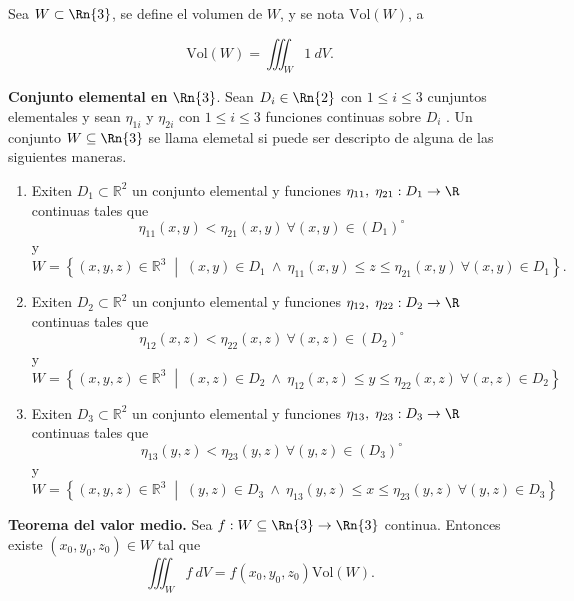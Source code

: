 \begin{definition} Sea $W\subset\Rn{3}$,  se define el volumen de $W$,  y se nota $\text{Vol}(W)$,  a  
    
    \[
        \text{Vol}(W)=\iiint_W 1 \:dV.
    \]
\end{definition}


\begin{definition}
    \textbf{Conjunto elemental en }$\Rn{3}$. Sean $D_i\in \Rn{2}$ con $1 \leq i \leq 3$  cunjuntos elementales y sean $\eta_{1i}$ y $\eta_{2i}$  con $1 \leq i \leq 3$ funciones continuas sobre $D_i$ .  Un conjunto $W\subseteq\Rn{3}$ se llama elemetal si puede ser descripto de alguna de las siguientes maneras. 
    \begin{enumerate}
    \item Exiten $D_1 \subset  \mathbb{R}^2 $ un conjunto elemental y funciones  $\eta_{11},\; \eta_{21}: D_1\to\R$  continuas  tales que $$\eta_{11}(x, y) <  \eta_{21}(x, y)  \: \forall (x,y) \in  (D_1)^{\circ}$$ y $$ W = \left\{ (x, y, z) \in \mathbb{R}^3 \;\middle|\;  (x,y) \in D_1 \: \land  \: \eta_{11}(x, y) \leq z \leq \eta_{21}(x, y)  \: \forall (x,y) \in D_1 \right\}.$$
	
	
	\item  Exiten $D_2 \subset  \mathbb{R}^2 $ un conjunto elemental y funciones  $\eta_{12},\; \eta_{22}: D_2\to\R$  continuas  tales que $$\eta_{12}(x, z) <  \eta_{22}(x, z)  \: \forall (x,z) \in  (D_2)^{\circ}$$ y $$W = \left\{ (x, y, z) \in \mathbb{R}^3 \;\middle|\;  (x,z) \in D_2   \: \land  \:  \eta_{12}(x, z) \leq y \leq \eta_{22}(x, z) \: \forall (x,z) \in D_2 \right\}$$
	
	\item  Exiten $D_3 \subset  \mathbb{R}^2 $  un conjunto elemental y funciones  $\eta_{13},\; \eta_{23}: D_3\to\R$  continuas  tales que $$\eta_{13}(y, z) <  \eta_{23}(y, z)  \: \forall (y,z) \in  (D_3)^{\circ}$$ y $$W = \left\{ (x, y, z) \in \mathbb{R}^3 \;\middle|\; (y,z) \in D_3   \: \land  \:  \eta_{13}(y, z) \leq x \leq \eta_{23}(y, z) \: \forall (y,z) \in D_3  \right\}$$
\end{enumerate}
\end{definition}


\begin{theorem} \textbf{Teorema del valor medio.}   Sea $f:W\subseteq\Rn{3}\to\Rn{3}$ continua.  Entonces existe $(x_0,y_0,z_0) \in W$ tal que 
    \[
        \iiint_W f\:dV=f(x_0,y_0,z_0)\text{Vol}(W).
    \]
\end{theorem}





